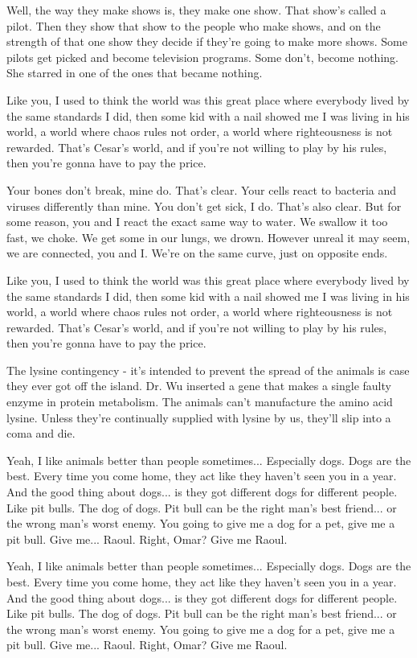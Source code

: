 \documentclass{book}
\begin{document}
Well, the way they make shows is, they make one show. That show's called a pilot. Then they show that show to the people who make shows, and on the strength of that one show they decide if they're going to make more shows. Some pilots get picked and become television programs. Some don't, become nothing. She starred in one of the ones that became nothing.

Like you, I used to think the world was this great place where everybody lived by the same standards I did, then some kid with a nail showed me I was living in his world, a world where chaos rules not order, a world where righteousness is not rewarded. That's Cesar's world, and if you're not willing to play by his rules, then you're gonna have to pay the price.

Your bones don't break, mine do. That's clear. Your cells react to bacteria and viruses differently than mine. You don't get sick, I do. That's also clear. But for some reason, you and I react the exact same way to water. We swallow it too fast, we choke. We get some in our lungs, we drown. However unreal it may seem, we are connected, you and I. We're on the same curve, just on opposite ends.

Like you, I used to think the world was this great place where everybody lived by the same standards I did, then some kid with a nail showed me I was living in his world, a world where chaos rules not order, a world where righteousness is not rewarded. That's Cesar's world, and if you're not willing to play by his rules, then you're gonna have to pay the price.

The lysine contingency - it's intended to prevent the spread of the animals is case they ever got off the island. Dr. Wu inserted a gene that makes a single faulty enzyme in protein metabolism. The animals can't manufacture the amino acid lysine. Unless they're continually supplied with lysine by us, they'll slip into a coma and die.

Yeah, I like animals better than people sometimes... Especially dogs. Dogs are the best. Every time you come home, they act like they haven't seen you in a year. And the good thing about dogs... is they got different dogs for different people. Like pit bulls. The dog of dogs. Pit bull can be the right man's best friend... or the wrong man's worst enemy. You going to give me a dog for a pet, give me a pit bull. Give me... Raoul. Right, Omar? Give me Raoul.

Yeah, I like animals better than people sometimes... Especially dogs. Dogs are the best. Every time you come home, they act like they haven't seen you in a year. And the good thing about dogs... is they got different dogs for different people. Like pit bulls. The dog of dogs. Pit bull can be the right man's best friend... or the wrong man's worst enemy. You going to give me a dog for a pet, give me a pit bull. Give me... Raoul. Right, Omar? Give me Raoul.
\end{document}
